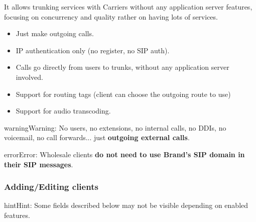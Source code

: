 \documentclass[letterpaper,10pt,english]{sphinxmanual}
\begin{document}
It allows trunking services with Carriers without any application server features,
focusing on concurrency and quality rather on having lots of services.
\begin{itemize}
\item {} 
Just make outgoing calls.

\item {} 
IP authentication only (no register, no SIP auth).

\item {} 
Calls go directly from users to trunks, without any application server involved.

\item {} 
Support for routing tags (client can choose the outgoing route to use)

\item {} 
Support for audio transcoding.

\end{itemize}

\begin{notice}{warning}{Warning:}
No users, no extensions, no internal calls, no DDIs, no voicemail, no call forwards...
just \textbf{outgoing external calls}.
\end{notice}

\begin{notice}{error}{Error:}
Wholesale clients \textbf{do not need to use Brand's SIP domain in their SIP messages}.
\end{notice}


\subsubsection{Adding/Editing clients}
\label{administration_portal/brand/clients/wholesale:adding-editing-clients}
\begin{notice}{hint}{Hint:}
Some fields described below may not be visible depending on enabled features.
\end{notice}
\end{document}
